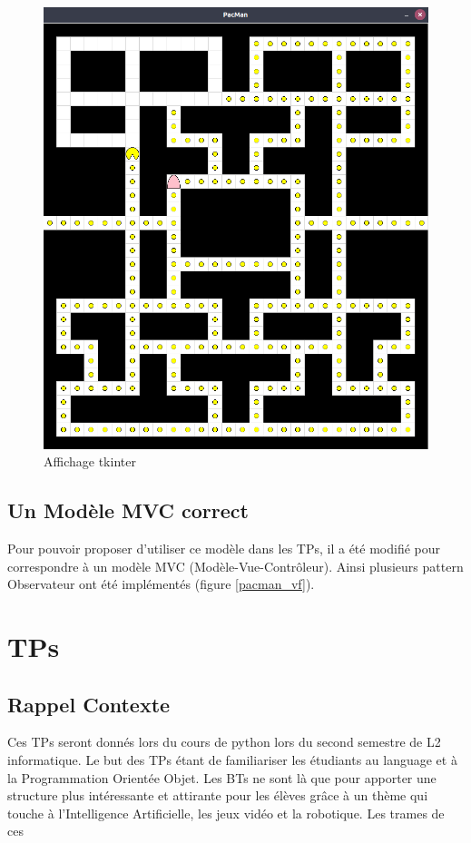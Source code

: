 \documentclass[11pt]{article}
\begin{document}
\begin{figure}[htb]
\centering
\includegraphics[width=.8\textwidth]{./img/PacMan.png}
\caption{\label{tkinter}Affichage tkinter}
\end{figure}



\subsection{Un Modèle MVC correct}
\label{sec-3-5}
Pour pouvoir proposer d'utiliser ce modèle dans les TPs, il a été modifié pour correspondre à un modèle MVC (Modèle-Vue-Contrôleur).
Ainsi plusieurs pattern Observateur ont été implémentés (figure \ref{pacman_vf}).


\section{TPs}
\label{sec-4}
\subsection{Rappel Contexte}
\label{sec-4-1}
Ces TPs seront donnés lors du cours de python lors du second semestre de L2 informatique.
Le but des TPs étant de familiariser les étudiants au language et à la Programmation Orientée Objet.
Les BTs ne sont là que pour apporter une structure plus intéressante et attirante pour les élèves grâce à un thème qui touche à l'Intelligence Artificielle, les jeux vidéo et la robotique. 
Les trames de ces 
\end{document}
